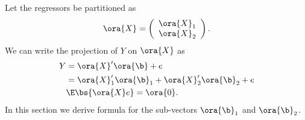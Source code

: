 Let the regressors be partitioned as 
\begin{equation}
    \label{hansen_eq_2_41}
    \ora{X} = \left(\begin{array}{c}
        \ora{X}_1 \\
        \ora{X}_2
    \end{array}\right).
\end{equation}
We can write the projection of $Y$ on $\ora{X}$ as 
\begin{equation}
    \label{hansen_eq_2_42}
    \begin{aligned}
        Y & = \ora{X}^{\prime} \ora{\b} + e \\
        & = \ora{X}_1^{\prime} \ora{\b}_1 + \ora{X}_2^{\prime} \ora{\b}_2 + e \\
        & \E\bs{\ora{X} e} = \ora{0}.
    \end{aligned}
\end{equation}
In this section we derive formula for the sub-vectors $\ora{\b}_1$ and $\ora{\b}_2$.

